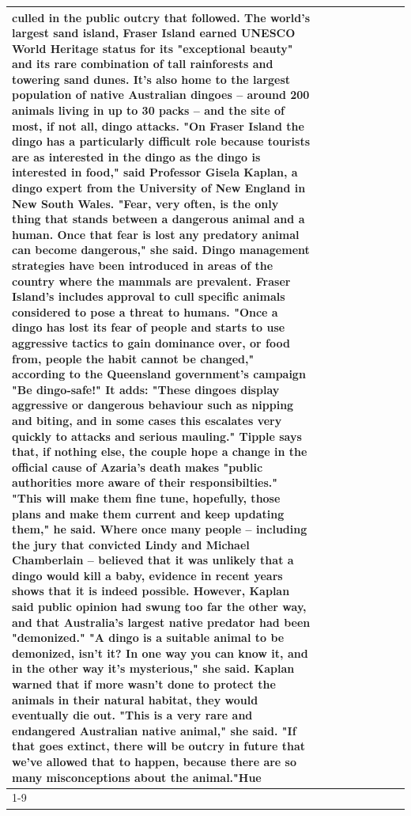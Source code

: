 \begin{table}[H]
\begin{tabular}{lllrlllll}
culled in the public outcry that followed. The world's largest sand island, Fraser Island earned UNESCO World Heritage status for its "exceptional beauty" and its rare combination of tall rainforests and towering sand dunes. It's also home to the largest population of native Australian dingoes -- around 200 animals living in up to 30 packs -- and the site of most, if not all, dingo attacks. "On Fraser Island the dingo has a particularly difficult role because tourists are as interested in the dingo as the dingo is interested in food," said Professor Gisela Kaplan, a dingo expert from the University of New England in New South Wales. "Fear, very often, is the only thing that stands between a dangerous animal and a human. Once that fear is lost any predatory animal can become dangerous," she said. Dingo management strategies have been introduced in areas of the country where the mammals are prevalent. Fraser Island's includes approval to cull specific animals considered to pose a threat to humans. "Once a dingo has lost its fear of people and starts to use aggressive tactics to gain dominance over, or food from, people the habit cannot be changed," according to the Queensland government's campaign "Be dingo-safe!" It adds: "These dingoes display aggressive or dangerous behaviour such as nipping and biting, and in some cases this escalates very quickly to attacks and serious mauling." Tipple says that, if nothing else, the couple hope a change in the official cause of Azaria's death makes "public authorities more aware of their responsibilties." "This will make them fine tune, hopefully, those plans and make them current and keep updating them," he said. Where once many people -- including the jury that convicted Lindy and Michael Chamberlain -- believed that it was unlikely that a dingo would kill a baby, evidence in recent years shows that it is indeed possible. However, Kaplan said public opinion had swung too far the other way, and that Australia's largest native predator had been "demonized." "A dingo is a suitable animal to be demonized, isn't it? In one way you can know it, and in the other way it's mysterious," she said. Kaplan warned that if more wasn't done to protect the animals in their natural habitat, they would eventually die out. "This is a very rare and endangered Australian native animal," she said. "If that goes extinct, there will be outcry in future that we've allowed that to happen, because there are so many misconceptions about the animal."Hue \\
\cline{1-9}

\end{tabular}
\end{table}
